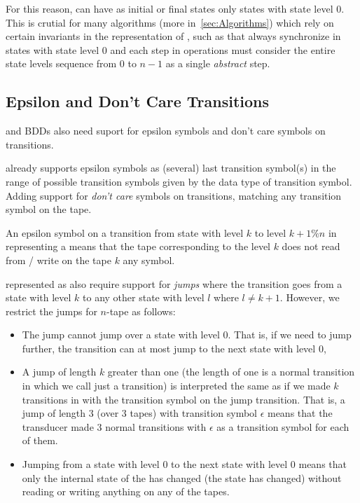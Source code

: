 For this reason, \nfts can have as initial or final states only states with state level $0$.
This is crutial for many algorithms (more in~\ref{sec:Algorithms}) which rely on certain invariants in the representation of \nfts, such as that \nfts always synchronize in states with state level $0$ and each step in operations must consider the entire state levels sequence from $0$ to $n-1$ as a single \emph{abstract} step.

\subsection{Epsilon and Don't Care Transitions}

\nfts and BDDs also need suport for epsilon symbols and don't care symbols on transitions.

\mata already supports epsilon symbols as (several) last transition symbol(s) in the range of possible transition symbols given by the data type of transition symbol.
Adding support for \emph{don't care} symbols on transitions, matching any transition symbol on the tape.

An epsilon symbol on a transition from state with level $k$ to level $k + 1 \% n$ in \nfaClass representing a \nft means that the tape corresponding to the level $k$ does not read from / write on the tape $k$ any symbol.

\nfts represented as \nfaClass also require support for \emph{jumps} where the transition goes from a state with level $k$ to any other state with level $l$ where $l \neq k + 1$.
However, we restrict the jumps for $n$-tape \nft as follows:
\begin{itemize}
  \item The jump cannot jump over a state with level $0$.
  That is, if we need to jump further, the transition can at most jump to the next state with level $0$,
  \item A jump of length $k$ greater than one (the length of one is a normal transition in \nfaClass which we call just a transition) is interpreted the same as if we made $k$ transitions in \nfaClass with the transition symbol on the jump transition.
  That is, a jump of length $3$ (over $3$ tapes) with transition symbol $\epsilon$ means that the transducer made $3$ normal transitions with $\epsilon$ as a transition symbol for each of them.
  \item Jumping from a state with level $0$ to the next state with level $0$ means that only the internal state of the \nft has changed (the state has changed) without reading or writing anything on any of the tapes.
\end{itemize}

